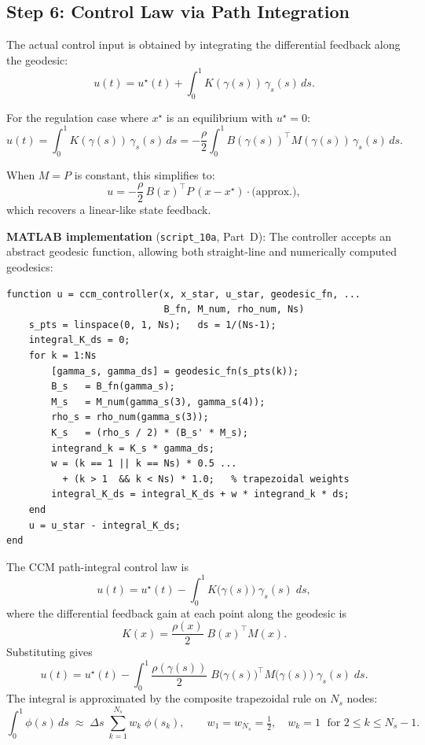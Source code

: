 \documentclass[11pt,a4paper]{article}
\begin{document}
\subsection{Step 6: Control Law via Path Integration}

The actual control input is obtained by integrating the differential feedback along the geodesic:
\[
u(t) = u^\star(t) + \int_0^1 K(\gamma(s))\,\gamma_s(s)\,ds.
\]

For the regulation case where \(x^\star\) is an equilibrium with \(u^\star = 0\):
\[
u(t) = \int_0^1 K(\gamma(s))\,\gamma_s(s)\,ds
     = -\frac{\rho}{2}\int_0^1 B(\gamma(s))^\top M(\gamma(s))\,\gamma_s(s)\,ds.
\]

When \(M = P\) is constant, this simplifies to:
\[
u = -\frac{\rho}{2}\,B(x)^\top P\,(x - x^\star) \cdot \text{(approx.)},
\]
which recovers a linear-like state feedback.

\noindent\textbf{MATLAB implementation} (\texttt{script\_10a}, Part~D): The controller accepts an abstract geodesic function, allowing both straight-line and numerically computed geodesics:

\begin{lstlisting}
function u = ccm_controller(x, x_star, u_star, geodesic_fn, ...
                            B_fn, M_num, rho_num, Ns)
    s_pts = linspace(0, 1, Ns);   ds = 1/(Ns-1);
    integral_K_ds = 0;
    for k = 1:Ns
        [gamma_s, gamma_ds] = geodesic_fn(s_pts(k));
        B_s   = B_fn(gamma_s);
        M_s   = M_num(gamma_s(3), gamma_s(4));
        rho_s = rho_num(gamma_s(3));
        K_s   = (rho_s / 2) * (B_s' * M_s);
        integrand_k = K_s * gamma_ds;
        w = (k == 1 || k == Ns) * 0.5 ...
          + (k > 1  && k < Ns) * 1.0;   % trapezoidal weights
        integral_K_ds = integral_K_ds + w * integrand_k * ds;
    end
    u = u_star - integral_K_ds;
end
\end{lstlisting}

\begin{codemath}
The CCM path-integral control law is
\[
u(t)
=
u^\star(t) - \int_0^1 K\!\bigl(\gamma(s)\bigr)\;\gamma_s(s)\;ds,
\]
where the differential feedback gain at each point along the geodesic is
\[
K(x) = \frac{\rho(x)}{2}\;B(x)^\top M(x).
\]
Substituting gives
\[
u(t)
=
u^\star(t)
-
\int_0^1
\frac{\rho(\gamma(s))}{2}\;
B\!\bigl(\gamma(s)\bigr)^\top
M\!\bigl(\gamma(s)\bigr)\;
\gamma_s(s)\;ds.
\]
The integral is approximated by the composite trapezoidal rule on \(N_s\) nodes:
\[
\int_0^1 \phi(s)\,ds
\;\approx\;
\Delta s\;\sum_{k=1}^{N_s} w_k\;\phi(s_k),
\qquad
w_1 = w_{N_s} = \tfrac{1}{2},
\quad
w_k = 1 \;\text{ for } 2 \le k \le N_s - 1.
\]
\end{codemath}
\end{document}

